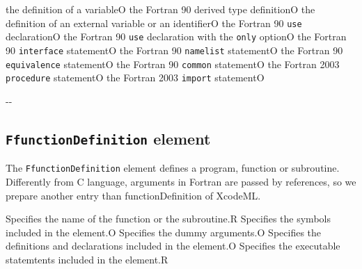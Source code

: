 \begin{XcodeMLChildElements}
{the definition of a variable}{O}
{the Fortran 90 derived type definition}{O}
{the definition of an external variable or an identifier}{O}
{the Fortran 90 {\tt use} declaration}{O}
{the Fortran 90 {\tt use} declaration with the {\tt only} option}{O}
{the Fortran 90 {\tt interface} statement}{O}
{the Fortran 90 {\tt namelist} statement}{O}
{the Fortran 90 {\tt equivalence} statement}{O}
{the Fortran 90 {\tt common} statement}{O}
{the Fortran 2003 {\tt procedure} statement}{O}
{the Fortran 2003 {\tt import}  statement}{O}
\end{XcodeMLChildElements}

\begin{XcodeMLAttributes}
\XcodeMLAttrDef{-}{-}
{-}{-}
\end{XcodeMLAttributes}


\subsection{ {\tt FfunctionDefinition} element}

The {\tt FfunctionDefinition} element defines a program, function or subroutine.
Differently from C language, arguments in Fortran are passed by references, so we prepare another entry than functionDefinition of XcodeML.


\begin{XcodeMLChildElements}
{Specifies the name of  the function or  the subroutine.}{R}
{Specifies the symbols included in the element.}{O}
{Specifies the dummy arguments.}{O}
{Specifies the definitions and declarations included in the element.}{O}
{Specifies the executable statemtents included in the element.}{R}
\end{XcodeMLChildElements}

